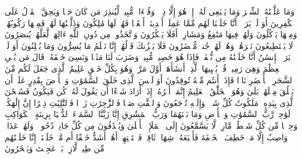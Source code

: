 \stopbuffer
\startbuffer[\q:36:69]
وَمَا عَلَّمۡنَٰهُ ٱلشِّعۡرَ وَمَا یَنۢبَغِی لَهُۥۤۚ إِنۡ هُوَ إِلَّا ذِكۡرࣱ وَقُرۡءَانࣱ مُّبِینࣱ%
\stopbuffer
\startbuffer[\q:36:70]
لِّیُنذِرَ مَن كَانَ حَیࣰّا وَیَحِقَّ ٱلۡقَوۡلُ عَلَى ٱلۡكَٰفِرِینَ%
\stopbuffer
\startbuffer[\q:36:71]
أَوَ لَمۡ یَرَوۡا۟ أَنَّا خَلَقۡنَا لَهُم مِّمَّا عَمِلَتۡ أَیۡدِینَاۤ أَنۡعَٰمࣰا فَهُمۡ لَهَا مَٰلِكُونَ%
\stopbuffer
\startbuffer[\q:36:72]
وَذَلَّلۡنَٰهَا لَهُمۡ فَمِنۡهَا رَكُوبُهُمۡ وَمِنۡهَا یَأۡكُلُونَ%
\stopbuffer
\startbuffer[\q:36:73]
وَلَهُمۡ فِیهَا مَنَٰفِعُ وَمَشَارِبُۚ أَفَلَا یَشۡكُرُونَ%
\stopbuffer
\startbuffer[\q:36:74]
وَٱتَّخَذُوا۟ مِن دُونِ ٱللَّهِ ءَالِهَةࣰ لَّعَلَّهُمۡ یُنصَرُونَ%
\stopbuffer
\startbuffer[\q:36:75]
لَا یَسۡتَطِیعُونَ نَصۡرَهُمۡ وَهُمۡ لَهُمۡ جُندࣱ مُّحۡضَرُونَ%
\stopbuffer
\startbuffer[\q:36:76]
فَلَا یَحۡزُنكَ قَوۡلُهُمۡۘ إِنَّا نَعۡلَمُ مَا یُسِرُّونَ وَمَا یُعۡلِنُونَ%
\stopbuffer
\startbuffer[\q:36:77]
أَوَ لَمۡ یَرَ ٱلۡإِنسَٰنُ أَنَّا خَلَقۡنَٰهُ مِن نُّطۡفَةࣲ فَإِذَا هُوَ خَصِیمࣱ مُّبِینࣱ%
\stopbuffer
\startbuffer[\q:36:78]
وَضَرَبَ لَنَا مَثَلࣰا وَنَسِیَ خَلۡقَهُۥۖ قَالَ مَن یُحۡیِ ٱلۡعِظَٰمَ وَهِیَ رَمِیمࣱ%
\stopbuffer
\startbuffer[\q:36:79]
قُلۡ یُحۡیِیهَا ٱلَّذِیۤ أَنشَأَهَاۤ أَوَّلَ مَرَّةࣲۖ وَهُوَ بِكُلِّ خَلۡقٍ عَلِیمٌ%
\stopbuffer
\startbuffer[\q:36:80]
ٱلَّذِی جَعَلَ لَكُم مِّنَ ٱلشَّجَرِ ٱلۡأَخۡضَرِ نَارࣰا فَإِذَاۤ أَنتُم مِّنۡهُ تُوقِدُونَ%
\stopbuffer
\startbuffer[\q:36:81]
أَوَ لَیۡسَ ٱلَّذِی خَلَقَ ٱلسَّمَٰوَٰتِ وَٱلۡأَرۡضَ بِقَٰدِرٍ عَلَىٰۤ أَن یَخۡلُقَ مِثۡلَهُمۚ بَلَىٰ وَهُوَ ٱلۡخَلَّٰقُ ٱلۡعَلِیمُ%
\stopbuffer
\startbuffer[\q:36:82]
إِنَّمَاۤ أَمۡرُهُۥۤ إِذَاۤ أَرَادَ شَیۡءًا أَن یَقُولَ لَهُۥ كُن فَیَكُونُ%
\stopbuffer
\startbuffer[\q:36:83]
فَسُبۡحَٰنَ ٱلَّذِی بِیَدِهِۦ مَلَكُوتُ كُلِّ شَیۡءࣲ وَإِلَیۡهِ تُرۡجَعُونَ%
\stopbuffer
\startbuffer[\q:37:1]
وَٱلصَّٰۤفَّٰتِ صَفࣰّا%
\stopbuffer
\startbuffer[\q:37:2]
فَٱلزَّٰجِرَٰتِ زَجۡرࣰا%
\stopbuffer
\startbuffer[\q:37:3]
فَٱلتَّٰلِیَٰتِ ذِكۡرًا%
\stopbuffer
\startbuffer[\q:37:4]
إِنَّ إِلَٰهَكُمۡ لَوَٰحِدࣱ%
\stopbuffer
\startbuffer[\q:37:5]
رَّبُّ ٱلسَّمَٰوَٰتِ وَٱلۡأَرۡضِ وَمَا بَیۡنَهُمَا وَرَبُّ ٱلۡمَشَٰرِقِ%
\stopbuffer
\startbuffer[\q:37:6]
إِنَّا زَیَّنَّا ٱلسَّمَاۤءَ ٱلدُّنۡیَا بِزِینَةٍ ٱلۡكَوَاكِبِ%
\stopbuffer
\startbuffer[\q:37:7]
وَحِفۡظࣰا مِّن كُلِّ شَیۡطَٰنࣲ مَّارِدࣲ%
\stopbuffer
\startbuffer[\q:37:8]
لَّا یَسَّمَّعُونَ إِلَى ٱلۡمَلَإِ ٱلۡأَعۡلَىٰ وَیُقۡذَفُونَ مِن كُلِّ جَانِبࣲ%
\stopbuffer
\startbuffer[\q:37:9]
دُحُورࣰاۖ وَلَهُمۡ عَذَابࣱ وَاصِبٌ%
\stopbuffer
\startbuffer[\q:37:10]
إِلَّا مَنۡ خَطِفَ ٱلۡخَطۡفَةَ فَأَتۡبَعَهُۥ شِهَابࣱ ثَاقِبࣱ%
\stopbuffer
\startbuffer[\q:37:11]
فَٱسۡتَفۡتِهِمۡ أَهُمۡ أَشَدُّ خَلۡقًا أَم مَّنۡ خَلَقۡنَاۤۚ إِنَّا خَلَقۡنَٰهُم مِّن طِینࣲ لَّازِبِۭ%
\stopbuffer
\startbuffer[\q:37:12]
بَلۡ عَجِبۡتَ وَیَسۡخَرُونَ%
\stopbuffer
